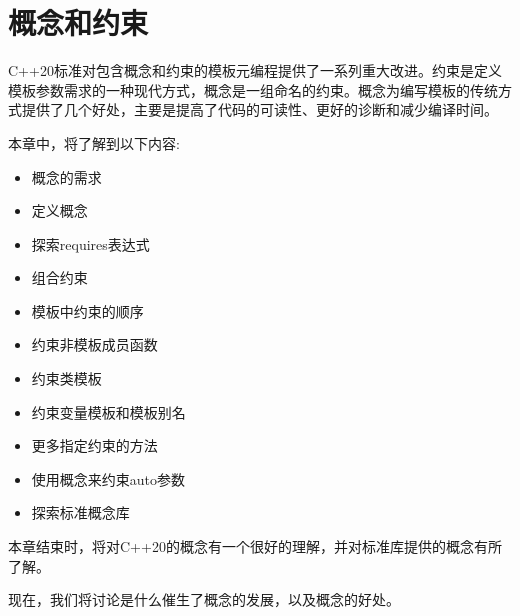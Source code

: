 \chapter{概念和约束}
C++20标准对包含概念和约束的模板元编程提供了一系列重大改进。约束是定义模板参数需求的一种现代方式，概念是一组命名的约束。概念为编写模板的传统方式提供了几个好处，主要是提高了代码的可读性、更好的诊断和减少编译时间。

本章中，将了解到以下内容:

\begin{itemize}
  \item 概念的需求
  \item 定义概念
  \item 探索requires表达式
  \item 组合约束
  \item 模板中约束的顺序
  \item 约束非模板成员函数
  \item 约束类模板
  \item 约束变量模板和模板别名
  \item 更多指定约束的方法
  \item 使用概念来约束auto参数
  \item 探索标准概念库
\end{itemize}

本章结束时，将对C++20的概念有一个很好的理解，并对标准库提供的概念有所了解。

现在，我们将讨论是什么催生了概念的发展，以及概念的好处。














